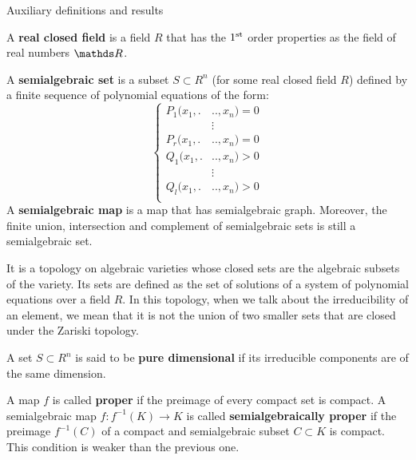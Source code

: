 \documentclass[11pt, a4paper, english, twoside, notitlepage]{report}
\begin{document}
\appendix
\begin{chapter}{Auxiliary definitions and results}

\begin{definition}\label{realCField}
	A \textbf{real closed field} is a field $R$ that has the $1\textsuperscript{st}$ order properties as the field of real numbers $\R$.
\end{definition}

\begin{definition}\label{semialgSet}
	A \textbf{semialgebraic set} is a subset $S \subset R^n$ (for some real closed field $R$) defined by a finite sequence of polynomial equations of the form:
	\begin{equation*}
	\left\{
	\begin{aligned}
		P_1(x_1, .&.., x_n) = 0\\
		&\vdots\\
		P_r(x_1, .&.., x_n) = 0 \\
		Q_1(x_1, .&.., x_n) > 0 \\
		&\vdots\\
		Q_l(x_1, .&.., x_n) > 0 \\
	\end{aligned}
	\right.
	\end{equation*}
	A \textbf{semialgebraic map} is a map that has semialgebraic graph. Moreover, the finite union, intersection and complement of semialgebraic sets is still a semialgebraic set.
\end{definition}

\begin{definition}\label{zariski}
	It is a topology on algebraic varieties whose closed sets are the algebraic subsets of the variety. Its sets are defined as the set of solutions of a system of polynomial equations over a field $R$. In this topology, when we talk about the irreducibility of an element, we mean that it is not the union of two smaller sets that are closed under the Zariski topology.
\end{definition}

\begin{definition}\label{pureDim}
	A set $S \subset R^n$ is said to be \textbf{pure dimensional} if its irreducible components are of the same dimension.
\end{definition}

\begin{definition}\label{properMap}
	A map $f$ is called \textbf{proper} if the preimage of every compact set is compact. A semialgebraic map $f: f^{-1}(K) \longrightarrow K$ is called \textbf{semialgebraically proper} if the preimage $f^{-1}(C)$ of a compact and semialgebraic subset $C \subset K$ is compact. This condition is weaker than the previous one.
\end{definition}


\end{chapter}
\end{document}

